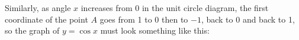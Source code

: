 
Similarly, as angle $x$ increases from 0 in the unit circle diagram,
the first coordinate of the point $A$ goes from 1 to 0 then to $-1$,
back to 0 and back to 1, so the graph of $y=\cos x$ must look
something like this:

